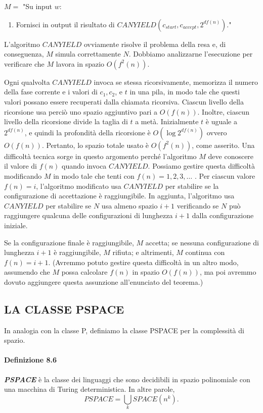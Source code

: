 \documentclass{article}
\begin{document}
\text{}
\newline
$M = $ "Su input $w$:
\begin{enumerate}
    \item Fornisci in output il risultato di $CANYIELD(c_{start}, c_{accept}, 2^{df(n)})$."
\end{enumerate}

L'algoritmo $CANYIELD$ ovviamente risolve il problema della resa e, di conseguenza, $M$ simula correttamente $N$.
Dobbiamo analizzarne l'esecuzione per verificare che $M$ lavora in spazio $O(f^2(n))$.

Ogni qualvolta $CANYIELD$ invoca se stessa ricorsivamente, memorizza il numero della fase corrente e i valori di $c_1, c_2$, e $t$ in una pila, in modo tale che questi valori possano essere recuperati dalla chiamata ricorsiva.
Ciascun livello della ricorsione usa perciò uno spazio aggiuntivo pari a $O(f(n))$. 
Inoltre, ciascun livello della ricorsione divide la taglia di $t$ a metà.
Inizialmente $t$ è uguale a $2^{df(n)}$, e quindi la profondità della ricorsione è $O (\log 2^{df(n)})$ ovvero $O(f(n))$. 
Pertanto, lo spazio totale usato è $O(f^2(n))$, come asserito.
Una difficoltà tecnica sorge in questo argomento perché l'algoritmo $M$ deve conoscere il valore di $f(n)$ quando invoca $CANYIELD$.
Possiamo gestire questa difficoltà modificando $M$ in modo tale che tenti con $f(n) = 1, 2, 3, \ldots$ .
Per ciascun valore $f(n) = i$, l'algoritmo modificato usa $CANYIELD$ per stabilire se la configurazione di accettazione è raggiungibile.
In aggiunta, l'algoritmo usa $CANYIELD$ per stabilire se $N$ usa almeno spazio $i + 1$ verificando se $N$ può raggiungere qualcuna delle configurazioni di lunghezza $i + 1$ dalla configurazione iniziale.

Se la configurazione finale è raggiungibile, $M$ accetta; 
se nessuna configurazione di lunghezza $i + 1$ è raggiungibile, $M$ rifiuta; 
e altrimenti, $M$ continua con $f(n) = i + 1$. 
(Avremmo potuto gestire questa difficoltà in
un altro modo, assumendo che $M$ possa calcolare $f(n)$ in spazio $O(f(n))$,
ma poi avremmo dovuto aggiungere questa assunzione all'enunciato del teorema.)

\subsection{LA CLASSE PSPACE}
In analogia con la classe P, definiamo la classe PSPACE per la complessità di spazio.

\paragraph{Definizione 8.6}
\label{definizione-8.6}
\vspace{1em}
\text{}
\newline
\begin{tcolorbox}[colback=white, colframe=black!50!red, title=\textbf{Definizione}]
    \textbf{\textit{PSPACE}} è la classe dei linguaggi che sono decidibili in spazio polinomiale con una macchina di Turing deterministica.
    \newline
    In altre parole,
    \[
    \textit{PSPACE} = \bigcup_{k} \textit{SPACE}(n^k).
    \]
\end{tcolorbox}
\end{document}
